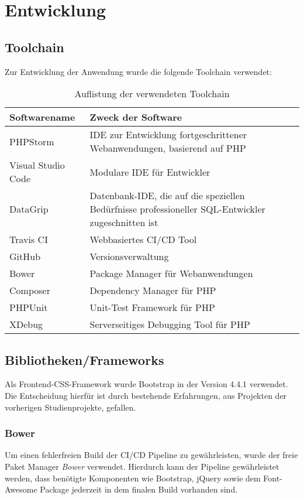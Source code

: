 \chapter{Entwicklung}\label{ch:entwicklung}

\section{Toolchain}\label{sec:toolchain}
Zur Entwicklung der Anwendung wurde die folgende Toolchain verwendet:

\begin{table}[htb]
\centering
\begin{tabular}{p{5cm}  p{9cm}}
\hline
\textbf{Softwarename} & \textbf{Zweck der Software}\\
\hline
PHPStorm & IDE zur Entwicklung fortgeschrittener Webanwendungen, basierend auf PHP\\
\hline
Visual Studio Code & Modulare IDE für Entwickler\\ 
\hline
DataGrip & Datenbank-IDE, die auf die speziellen Bedürfnisse professioneller SQL-Entwickler zugeschnitten ist\\
\hline
Travis CI & Webbasiertes CI/CD Tool\\
\hline
GitHub & Versionsverwaltung\\
\hline
Bower & Package Manager für Webanwendungen\\
\hline
Composer & Dependency Manager für PHP \\
\hline
PHPUnit & Unit-Test Framework für PHP \\ 
\hline
XDebug & Serverseitiges Debugging Tool für PHP \\
\hline
\end{tabular}
\caption{Auflistung der verwendeten Toolchain}
\end{table}

\section{Bibliotheken/Frameworks}\label{sec:bibliotheken/frameworks}
Als Frontend-CSS-Framework wurde Bootstrap in der Version 4.4.1 verwendet. Die Entscheidung hierfür ist durch bestehende Erfahrungen, aus Projekten der vorherigen Studienprojekte, gefallen.
\subsection{Bower}\label{subsec:bower}
Um einen fehlerfreien Build der CI/CD Pipeline zu gewährleisten, wurde der freie Paket Manager \emph{Bower} verwendet. Hierdurch kann der Pipeline gewährleistet werden, dass benötigte Komponenten wie Bootstrap, jQuery sowie dem Font-Awesome Package jederzeit in dem finalen Build vorhanden sind.
